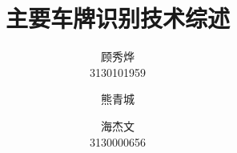 \documentclass{article}
\title {主要车牌识别技术综述}
\author{
    顾秀烨\\
    3130101959
    \and
    熊青城\\
    \and
    海杰文\\
    3130000656
}
\begin{document}
\maketitle
\tableofcontents





\renewcommand\refname{参考文献}


\end{document}
